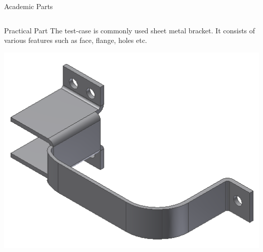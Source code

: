 \begin{frame}{Academic Parts}
\begin{center}
{\begin{tabular}[h]{@{}p{0.22\linewidth} p{0.22\linewidth}  p{0.22\linewidth}  p{0.22\linewidth} @{}}
\bottomrule
\end{tabular}
}
\label{tbl_fbcm}
\end{center}

\end{frame}


\begin{frame}{Practical Part}
The test-case is commonly used sheet metal bracket. It consists of various features such as face, flange, holes etc.

\includegraphics[width=0.8\linewidth]{../Common/images/nonCellularBracket}
\end{frame}


